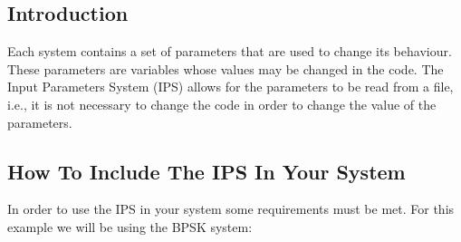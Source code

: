 \subsection{Introduction}
Each system contains a set of parameters that are used to change its behaviour.
These parameters are variables whose values may be changed in the code. The Input Parameters System (IPS) allows
for the parameters to be read from a file, i.e., it is not necessary to change the code in order to change the value
of the parameters.

\subsection{How To Include The IPS In Your System}
In order to use the IPS in your system some requirements must be met. For this example we will be using the BPSK system:
